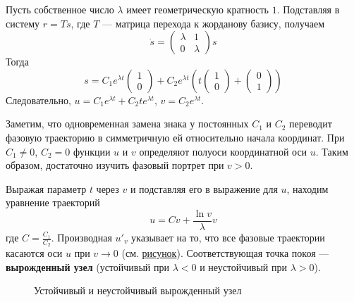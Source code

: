 \documentclass{article}
\begin{document}
Пусть собственное число $\lambda$ имеет геометрическую кратность $1$. Подставляя в систему $r = Ts$, где $T$ --- матрица перехода к жорданову базису, получаем
\begin{equation*}
    \dot{s} =
    \begin{pmatrix}
    \lambda & 1\\
    0 & \lambda
    \end{pmatrix}
    s
\end{equation*}
Тогда
\begin{equation*}
    s = C_1e^{\lambda t}
    \begin{pmatrix}
    1\\
    0
    \end{pmatrix}
    + C_2e^{\lambda t} (t
    \begin{pmatrix}
    1\\
    0
    \end{pmatrix}
    +
    \begin{pmatrix}
    0\\
    1
    \end{pmatrix}
    )
\end{equation*}
Следовательно, $u = C_1e^{\lambda t} + C_2te^{\lambda t}$, $v = C_2e^{\lambda t}$.

Заметим, что одновременная замена знака у постоянных $C_1$ и $C_2$ переводит фазовую траекторию в симметричную ей относительно начала координат. При $C_1 \neq 0$, $C_2 = 0$ функции $u$ и $v$ определяют полуоси координатной оси $u$. Таким образом, достаточно изучить фазовый портрет при $v > 0$.

Выражая параметр $t$ через $v$ и подставляя его в выражение для $u$, находим уравнение траекторий
\begin{equation*}
    u = Cv + \frac{\ln{v}}{\lambda}v
\end{equation*}
где $C = \frac{C_1}{C_2}$. Производная $u'_v$ указывает на то, что все фазовые траектории касаются оси $u$ при $v \to 0$ (см. \hyperref[virozhd]{рисунок}). Соответствующая точка покоя --- \textbf{вырожденный узел} (устойчивый при $\lambda < 0$ и неустойчивый при $\lambda > 0$).

\begin{figure}[H]\label{virozhd}
    \caption{Устойчивый и неустойчивый вырожденный узел}
\end{figure}
\end{document}
